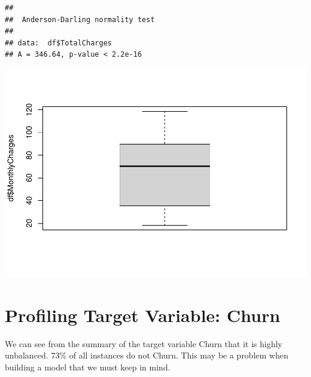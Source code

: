 \documentclass[
]{article}
\newenvironment{Shaded}{\begin{snugshade}}{\end{snugshade}}
\newcommand{\AttributeTok}[1]{\textcolor[rgb]{0.13,0.29,0.53}{#1}}
\newcommand{\CommentTok}[1]{\textcolor[rgb]{0.56,0.35,0.01}{\textit{#1}}}
\newcommand{\ConstantTok}[1]{\textcolor[rgb]{0.56,0.35,0.01}{#1}}
\newcommand{\DecValTok}[1]{\textcolor[rgb]{0.00,0.00,0.81}{#1}}
\newcommand{\FloatTok}[1]{\textcolor[rgb]{0.00,0.00,0.81}{#1}}
\newcommand{\FunctionTok}[1]{\textcolor[rgb]{0.13,0.29,0.53}{\textbf{#1}}}
\newcommand{\NormalTok}[1]{#1}
\newcommand{\SpecialCharTok}[1]{\textcolor[rgb]{0.81,0.36,0.00}{\textbf{#1}}}
\begin{document}
\begin{verbatim}
## 
##  Anderson-Darling normality test
## 
## data:  df$TotalCharges
## A = 346.64, p-value < 2.2e-16
\end{verbatim}

\begin{Shaded}
\end{Shaded}

\includegraphics{Assignment2_script_files/figure-latex/unnamed-chunk-23-2.pdf}

\hypertarget{profiling-target-variable-churn}{%
\section{Profiling Target Variable:
Churn}\label{profiling-target-variable-churn}}

We can see from the summary of the target variable Churn that it is
highly unbalanced. 73\% of all instances do not Churn. This may be a
problem when building a model that we must keep in mind.
\end{document}
